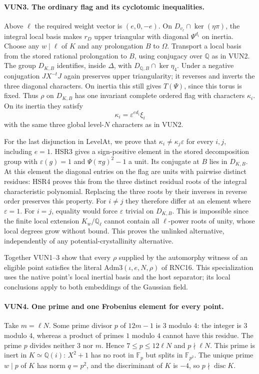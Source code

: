 \paragraph{VUN3. The ordinary flag and its cyclotomic inequalities.}
\label{claim:VUN3}
Above $\ell$ the required weight vector is $(e,0,-e)$. On
$D_{v_\ell}\cap\ker(\eta\pi)$, the integral local basis makes
$r_D$ upper triangular with diagonal $\Psi^{d_i}$ on inertia.
Choose any $w\mid\ell$ of $K$ and any prolongation $B$ to $\Omega$.
Transport a local basis from the stored rational prolongation to $B$,
using conjugacy over $\mathbb Q$ as in VUN2. The group
$D_{K,B}$ identifies, inside $\Delta$, with
$D_{\mathbb Q,B}\cap\ker\eta_4$. Under a negative conjugation
$JX^{-t}J$ again preserves upper triangularity; it reverses and
inverts the three diagonal characters. On inertia this still
gives $T(\Psi)$, since this torus is fixed. Thus $\rho$ on
$D_{K,B}$ has one invariant complete ordered flag with characters
$\kappa_i$. On its inertia they satisfy
\[
                \kappa_i=\varepsilon^{e d_i}\xi_i
\]
with the same three global level-$N$ characters as in VUN2.

For the last disjunction in $\mathrm{LevelAt}$, we prove that
$\kappa_i\ne\kappa_j\varepsilon$ for every $i,j$, including
$e=1$. HSR3 gives a sign-positive element in the stored
decomposition group with $\varepsilon(g)=1$ and $\Psi(\pi g)^2-1$
a unit. Its conjugate at $B$ lies in $D_{K,B}$. At this element
the diagonal entries on the flag are units with pairwise distinct
residues: HSR4 proves this from the three distinct residual roots
of the integral characteristic polynomial. Replacing the three
roots by their inverses in reverse order preserves this property.
For $i\ne j$ they therefore differ at an element where
$\varepsilon=1$. For $i=j$, equality would force $\varepsilon$
trivial on $D_{K,B}$. This is impossible since the finite local
extension $K_w/\mathbb Q_\ell$ cannot contain all $\ell$-power
roots of unity, whose local degrees grow without bound.
This proves the unlinked alternative, independently of any
potential-crystallinity alternative.

Together VUN1--3 show that every $\rho$ supplied by the automorphy
witness of an eligible point satisfies the literal
$\mathrm{Adm3}(\iota,e,N,\rho)$ of RNC16. This specialization
uses the native point's local inertial basis and the host separator;
its local conclusions apply to both embeddings of the Gaussian field.

\paragraph{VUN4. One prime and one Frobenius element for every point.}
\label{claim:VUN4}
Take $m=\ell N$. Some prime divisor $p$ of $12m-1$ is $3$ modulo
$4$: the integer is $3$ modulo $4$, whereas a product of primes
$1$ modulo $4$ cannot have this residue. The prime $p$ divides
neither $3$ nor $m$. Hence $7\le p\le 12\ell N$ and $p\nmid
\ell N$. This prime is inert in $K\simeq\mathbb Q(i)$:
$X^2+1$ has no root in $\mathbb F_p$ but splits in $\mathbb F_{p^2}$.
The unique prime $w\mid p$ of $K$ has norm $q=p^2$, and the
discriminant of $K$ is $-4$, so $p\nmid\operatorname{disc} K$.


